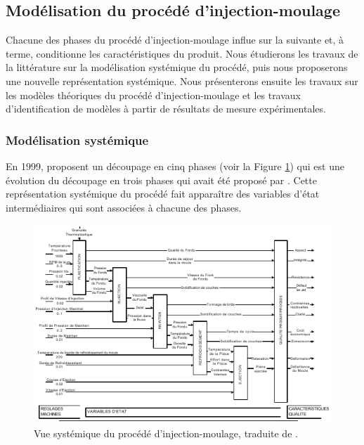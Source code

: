 \subsection{Modélisation du procédé d'injection-moulage} \label{subsec:molding_model}
Chacune des phases du procédé d'injection-moulage influe sur la suivante et, à terme, conditionne les caractéristiques du produit.
Nous étudierons les travaux de la littérature sur la modélisation systémique du procédé, puis nous proposerons une nouvelle représentation systémique.
Nous présenterons ensuite les travaux sur les modèles théoriques du procédé d'injection-moulage et les travaux d'identification de modèles à partir de résultats de mesure expérimentales.

\subsubsection{Modélisation systémique} \label{subsubsec:molding_systemic}
En 1999, \citeauthor{kazmer_towards_1999} proposent un découpage en cinq phases \cite{kazmer_towards_1999} (voir la Figure \ref{fig:kazmer_systematic}) qui est une évolution du découpage en trois phases qui avait été proposé par \citeauthor{ma_design_1974} \cite{ma_design_1974}.
Cette représentation systémique du procédé fait apparaître des variables d’état intermédiaires qui sont associées à chacune des phases.

\begin{figure}[bthp]
	\centering
	\includegraphics[width=\textwidth,height=\textheight,keepaspectratio]{../Chap1/Figures/Kazmer_1999-Process.pdf}
	\caption{Vue systémique du procédé d'injection-moulage, traduite de \citeauthor{kazmer_towards_1999} \cite{kazmer_towards_1999}.}
	\label{fig:kazmer_systematic}
\end{figure}

